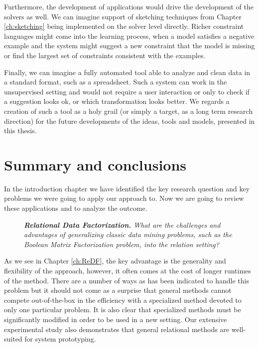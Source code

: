 Furthermore, the development of applications would drive  the
development of the solvers as well. We can imagine support of
sketching techniques from Chapter \ref{ch:sketching} being implemented
on the solver level directly. Richer constraint languages might come
into the learning process, when a model satisfies a negative example
and the system might suggest a new constraint that the model is
missing or find the largest set of constraints consistent with the
examples.

Finally, we can imagine a fully automated tool able to analyze and
clean data in a standard format, such as a spreadsheet. Such a system
can work in the unsupervised setting and would not require a user interaction
or only to check if a suggestion looks ok, or which transformation looks better.
We regards a creation of such a tool as a holy grail (or simply a
target, as a long term research direction) for
the future developments of the ideas, tools and models, presented in
this thesis.


\section{Summary and conclusions}
In the introduction chapter we have identified the key research
question and key problems we were going to apply our approach to. Now
we are going to review these applications and to analyze the outcome.

\begin{description}
\item[\cone] \textit{\textbf{Relational Data Factorization.} What are the challenges and advantages of generalizing classic data mining problems, such as the Boolean Matrix
    Factorization problem, into the relation setting?}
\end{description}

As we see in Chapter \ref{ch:ReDF}, the key advantage is the
generality and flexibility of the approach, however, it often comes at
the cost of longer runtimes of the method. There are a number of ways
as has been indicated to handle this problem but it should not come as
a surprise that general methods cannot compete out-of-the-box in the efficiency with
a specialized method devoted to only one particular problem. It is
also clear that specialized methods must be significantly modified in
order to be used in a new setting. Our extensive experimental study
also demonstrates that general relational methods are well-suited for
system prototyping.

